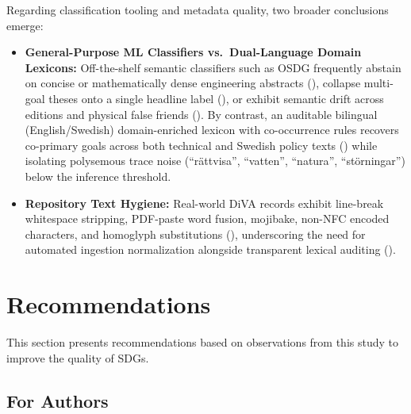 Regarding classification tooling and metadata quality, two broader conclusions emerge:
\begin{itemize}
    \item \textbf{General-Purpose ML Classifiers vs.\ Dual-Language Domain Lexicons:} Off-the-shelf semantic classifiers such as OSDG frequently abstain on concise or mathematically dense engineering abstracts (), collapse multi-goal theses onto a single headline label (), or exhibit semantic drift across editions and physical false friends (). By contrast, an auditable bilingual (English/Swedish) domain-enriched lexicon with co-occurrence rules recovers co-primary goals across both technical and Swedish policy texts () while isolating polysemous trace noise (\eg \enquote{\foreignlanguage{swedish}{rättvisa}}, \enquote{\foreignlanguage{swedish}{vatten}}, \enquote{\foreignlanguage{swedish}{natura}}, \enquote{\foreignlanguage{swedish}{störningar}}) below the inference threshold.

    \item \textbf{Repository Text Hygiene:} Real-world \gls{DiVA} records exhibit line-break whitespace stripping, PDF-paste word fusion, mojibake, non-NFC encoded characters, and homoglyph substitutions (), underscoring the need for automated ingestion normalization alongside transparent lexical auditing ().
\end{itemize}



\clearpage
\section{Recommendations}
\label{sec:recommendations}
This section presents recommendations based on observations from this study to improve the quality of \glspl{SDG}.

\subsection{For Authors}

